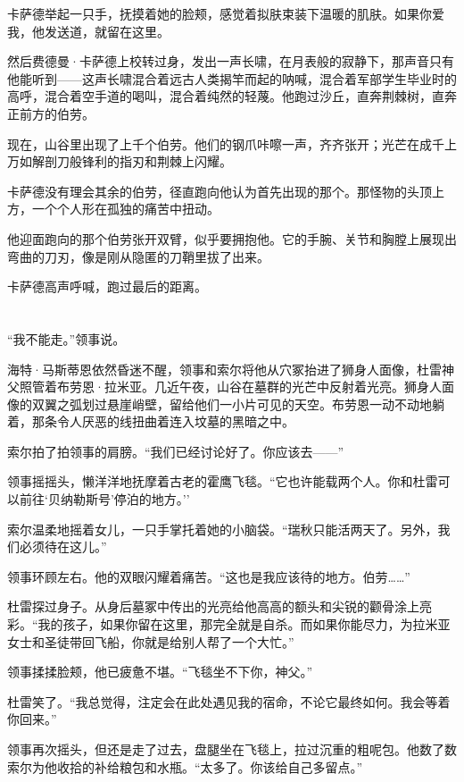 \documentclass[AutoFakeBold=true]{book}
\begin{document}
卡萨德举起一只手，抚摸着她的脸颊，感觉着拟肤束装下温暖的肌肤。{\kaishu 如果你爱我，}他发送道，{\kaishu 就留在这里。}

然后费德曼·卡萨德上校转过身，发出一声长啸，在月表般的寂静下，那声音只有他能听到——这声长啸混合着远古人类揭竿而起的呐喊，混合着军部学生毕业时的高呼，混合着空手道的喝叫，混合着纯然的轻蔑。他跑过沙丘，直奔荆棘树，直奔正前方的伯劳。

现在，山谷里出现了上千个伯劳。他们的钢爪咔嚓一声，齐齐张开；光芒在成千上万如解剖刀般锋利的指刃和荆棘上闪耀。

卡萨德没有理会其余的伯劳，径直跑向他认为首先出现的那个。那怪物的头顶上方，一个个人形在孤独的痛苦中扭动。

他迎面跑向的那个伯劳张开双臂，似乎要拥抱他。它的手腕、关节和胸膛上展现出弯曲的刀刃，像是刚从隐匿的刀鞘里拔了出来。

卡萨德高声呼喊，跑过最后的距离。

\chapter{}

``我不能走。''领事说。

海特·马斯蒂恩依然昏迷不醒，领事和索尔将他从穴冢抬进了狮身人面像，杜雷神父照管着布劳恩·拉米亚。几近午夜，山谷在墓群的光芒中反射着光亮。狮身人面像的双翼之弧划过悬崖峭壁，留给他们一小片可见的天空。布劳恩一动不动地躺着，那条令人厌恶的线扭曲着连入坟墓的黑暗之中。

索尔拍了拍领事的肩膀。``我们已经讨论好了。你应该去——''

领事摇摇头，懒洋洋地抚摩着古老的霍鹰飞毯。``它也许能载两个人。你和杜雷可以前往`贝纳勒斯号'停泊的地方。''

索尔温柔地摇着女儿，一只手掌托着她的小脑袋。``瑞秋只能活两天了。另外，我们必须待在这儿。''

领事环顾左右。他的双眼闪耀着痛苦。``这也是我应该待的地方。伯劳……''

杜雷探过身子。从身后墓冢中传出的光亮给他高高的额头和尖锐的颧骨涂上亮彩。``我的孩子，如果你留在这里，那完全就是自杀。而如果你能尽力，为拉米亚女士和圣徒带回飞船，你就是给别人帮了一个大忙。''

领事揉揉脸颊，他已疲惫不堪。``飞毯坐不下你，神父。''

杜雷笑了。``我总觉得，注定会在此处遇见我的宿命，不论它最终如何。我会等着你回来。''

领事再次摇头，但还是走了过去，盘腿坐在飞毯上，拉过沉重的粗呢包。他数了数索尔为他收拾的补给粮包和水瓶。``太多了。你该给自己多留点。''
\end{document}
